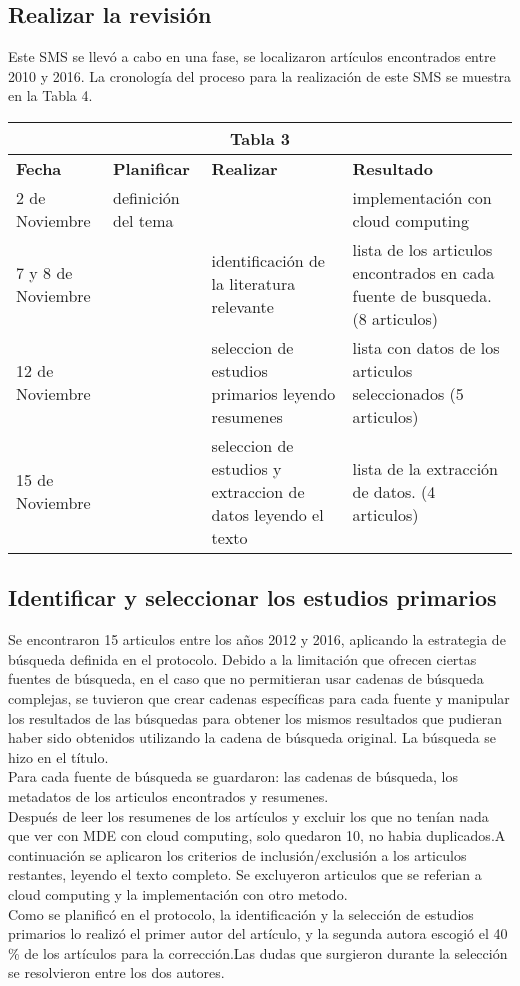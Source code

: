 \documentclass{llncs}
\begin{document}
\subsection{Realizar la revisión}
Este SMS se llevó a cabo en una fase, se localizaron artículos encontrados entre 2010 y 2016. La cronología del proceso para la realización de este SMS se muestra en la Tabla 4. \\
\begin{tabular}{  | p{2cm} | p{3cm}  |  p{3cm} | p{3cm} |}
  \hline
  \multicolumn{4}{|c|}{\bf Tabla 3} \\
  \hline
  \bf Fecha  & \bf Planificar & \bf Realizar & \bf Resultado \\
  \hline
   2 de Noviembre  & definición del tema & & implementación con cloud computing\\
  \hline
   7 y 8 de Noviembre &  & identificación de la literatura relevante & lista de los articulos encontrados en cada fuente de busqueda.(8 articulos)\\
   \hline
    12 de Noviembre  & & seleccion de estudios primarios leyendo resumenes & lista con datos de los articulos seleccionados (5 articulos)\\
    \hline
     15 de Noviembre & & seleccion de estudios y extraccion de datos leyendo el texto & lista de la extracción de datos. (4 articulos) \\
    \hline
 \end{tabular}



\subsection{Identificar y seleccionar los estudios primarios}
Se encontraron 15 articulos entre los años 2012 y 2016, aplicando la estrategia de búsqueda definida en el protocolo. Debido a la limitación que ofrecen ciertas fuentes de búsqueda, en el caso que no permitieran usar cadenas de búsqueda complejas, se tuvieron que crear cadenas específicas para cada fuente y manipular los resultados de las búsquedas para obtener los mismos resultados que pudieran haber sido obtenidos utilizando la cadena de búsqueda original. La búsqueda se hizo en el título.\\
Para cada fuente de búsqueda se guardaron: las cadenas de búsqueda, los metadatos de los articulos encontrados y resumenes.\\
Después de leer los resumenes de los artículos y excluir los que no tenían nada que ver con MDE con cloud computing, solo quedaron 10, no habia duplicados.A continuación se aplicaron los criterios de inclusión/exclusión a los articulos restantes, leyendo el texto completo. Se excluyeron articulos que se referian a cloud computing y la implementación con otro metodo.\\
Como se planificó en el protocolo, la identificación y la selección de estudios primarios lo realizó el primer autor del artículo, y la segunda autora escogió el 40 \% de los artículos para la corrección.Las dudas que surgieron durante la selección se resolvieron entre los dos autores.\\ \\ \\
\end{document}
